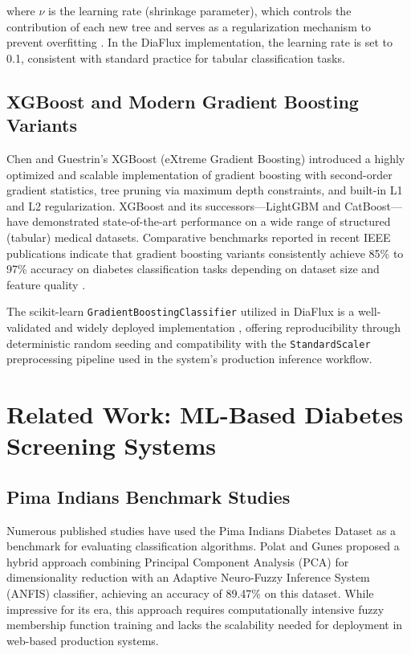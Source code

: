 \documentclass[12pt,a4paper]{report}
\begin{document}
where $\nu$ is the learning rate (shrinkage parameter), which controls the contribution of each new tree and serves as a regularization mechanism to prevent overfitting \cite{friedman_gb}. In the DiaFlux implementation, the learning rate is set to 0.1, consistent with standard practice for tabular classification tasks.

\subsection{XGBoost and Modern Gradient Boosting Variants}
Chen and Guestrin's XGBoost (eXtreme Gradient Boosting) \cite{xgboost} introduced a highly optimized and scalable implementation of gradient boosting with second-order gradient statistics, tree pruning via maximum depth constraints, and built-in L1 and L2 regularization. XGBoost and its successors---LightGBM and CatBoost---have demonstrated state-of-the-art performance on a wide range of structured (tabular) medical datasets. Comparative benchmarks reported in recent IEEE publications indicate that gradient boosting variants consistently achieve 85\% to 97\% accuracy on diabetes classification tasks depending on dataset size and feature quality \cite{sisodia_diabetes, vijayan_svm}.

The scikit-learn \texttt{GradientBoostingClassifier} utilized in DiaFlux is a well-validated and widely deployed implementation \cite{scikit_learn}, offering reproducibility through deterministic random seeding and compatibility with the \texttt{StandardScaler} preprocessing pipeline used in the system's production inference workflow.

\section{Related Work: ML-Based Diabetes Screening Systems}

\subsection{Pima Indians Benchmark Studies}
Numerous published studies have used the Pima Indians Diabetes Dataset as a benchmark for evaluating classification algorithms. Polat and Gunes \cite{polat_anfis} proposed a hybrid approach combining Principal Component Analysis (PCA) for dimensionality reduction with an Adaptive Neuro-Fuzzy Inference System (ANFIS) classifier, achieving an accuracy of 89.47\% on this dataset. While impressive for its era, this approach requires computationally intensive fuzzy membership function training and lacks the scalability needed for deployment in web-based production systems.
\end{document}
